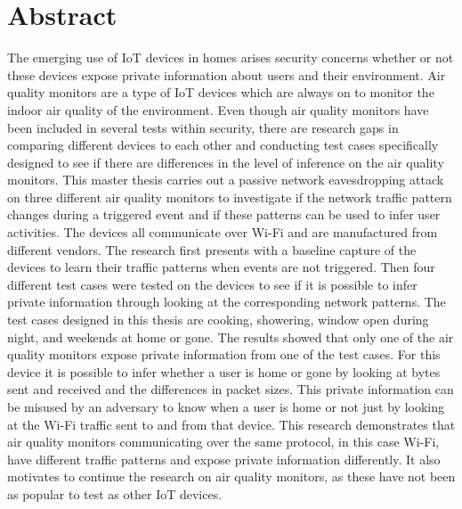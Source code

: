 \chapter*{Abstract}
The emerging use of IoT devices in homes arises security concerns whether or not these devices expose private information about users and their environment. Air quality monitors are a type of IoT devices which are always on to monitor the indoor air quality of the environment. Even though air quality monitors have been included in several tests within security, there are research gaps in comparing different devices to each other and conducting test cases specifically designed to see if there are differences in the level of inference on the air quality monitors. This master thesis carries out a passive network eavesdropping attack on three different air quality monitors to investigate if the network traffic pattern changes during a triggered event and if these patterns can be used to infer user activities. The devices all communicate over Wi-Fi and are manufactured from different vendors. The research first presents with a baseline capture of the devices to learn their traffic patterns when events are not triggered. Then four different test cases were tested on the devices to see if it is possible to infer private information through looking at the corresponding network patterns. The test cases designed in this thesis are cooking, showering, window open during night, and weekends at home or gone. The results showed that only one of the air quality monitors expose private information from one of the test cases. For this device it is possible to infer whether a user is home or gone by looking at bytes sent and received and the differences in packet sizes. This private information can be misused by an adversary to know when a user is home or not just by looking at the Wi-Fi traffic sent to and from that device. This research demonstrates that air quality monitors communicating over the same protocol, in this case Wi-Fi, have different traffic patterns and expose private information differently. It also motivates to continue the research on air quality monitors, as these have not been as popular to test as other IoT devices. 